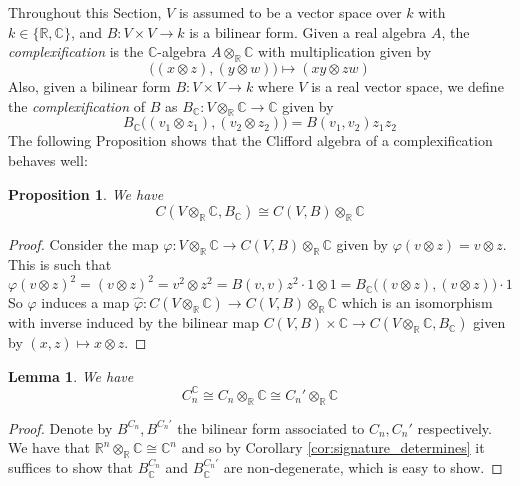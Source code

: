 \documentclass[12pt]{article}
\theoremstyle{plain}
\newtheorem{proposition}[thm]{Proposition}
\newtheorem{lemma}[thm]{Lemma}
\theoremstyle{definition}
\newcommand{\bb}[1]{\mathbb{#1}}
\newcommand{\lto}{\longrightarrow}
\begin{document}
Throughout this Section, $V$ is assumed to be a vector space over $k$ with $k \in \lbrace \bb{R},\bb{C}\rbrace$, and $B: V \times V \lto k$ is a bilinear form.
Given a real algebra $A$, the \emph{complexification} is the $\bb{C}$-algebra $A \otimes_\bb{R} \bb{C}$ with multiplication given by 
\begin{equation}
\big((x \otimes z),(y\otimes w)\big)\longmapsto (xy \otimes zw)
\end{equation}
Also, given a bilinear form $B: V \times V \lto k$ where $V$ is a real vector space, we define the \emph{complexification} of $B$ as $B_{\bb{C}}: V \otimes_{\bb{R}} \bb{C} \lto \bb{C}$ given by
\begin{equation}
B_{\bb{C}}\big((v_1 \otimes z_1),(v_2 \otimes z_2)\big) = B(v_1,v_2)z_1z_2
\end{equation}
The following Proposition shows that the Clifford algebra of a complexification behaves well:
\begin{proposition}
We have
\begin{equation}
C(V \otimes_{\bb{R}} \bb{C}, B_{\bb{C}}) \cong C(V,B) \otimes_{\bb{R}} \bb{C}
\end{equation}
\end{proposition}
\begin{proof}
Consider the map $\varphi: V \otimes_{\bb{R}}\bb{C} \lto C(V,B) \otimes_{\bb{R}} \bb{C}$ given by $\varphi(v \otimes z) = v \otimes z$. This is such that
\begin{equation}
\varphi(v \otimes z)^2 = (v \otimes z)^2 = v^2 \otimes z^2 = B(v,v)z^2 \cdot 1 \otimes 1 = B_{\bb{C}}\big((v\otimes z),(v\otimes z)\big)\cdot 1
\end{equation}
So $\varphi$ induces a map $\hat{\varphi}: C(V \otimes_{\bb{R}}\bb{C}) \lto C(V,B) \otimes_{\bb{R}} \bb{C}$ which is an isomorphism with inverse induced by the bilinear map $C(V,B) \times \bb{C} \lto C(V \otimes_{\bb{R} }\bb{C}, B_{\bb{C}})$ given by $(x,z) \longmapsto x \otimes z$.
\end{proof}
\begin{lemma}\label{lem:complexification}
We have
\begin{equation}
C_n^{\bb{C}} \cong C_n \otimes_{\bb{R}} \bb{C} \cong C_n' \otimes_{\bb{R}} \bb{C}
\end{equation}
\end{lemma}
\begin{proof}
Denote by $B^{C_n}, B^{C_n'}$ the bilinear form associated to $C_n,C_{n}'$ respectively. We have that $\bb{R}^n \otimes_{\bb{R}}\bb{C} \cong \bb{C}^n$ and so by Corollary \ref{cor:signature_determines} it suffices to show that $B^{C_n}_{\bb{C}}$ and $B^{C_n'}_{\bb{C}}$ are non-degenerate, which is easy to show.
\end{proof}
\end{document}
